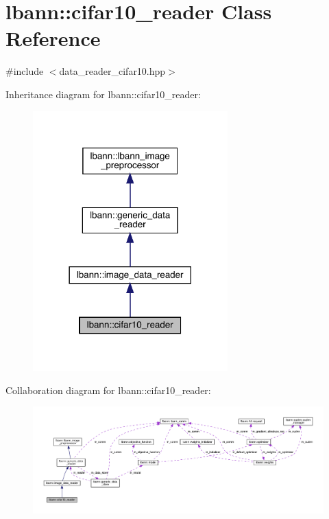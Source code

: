 \hypertarget{classlbann_1_1cifar10__reader}{}\section{lbann\+:\+:cifar10\+\_\+reader Class Reference}
\label{classlbann_1_1cifar10__reader}


{\ttfamily \#include $<$data\+\_\+reader\+\_\+cifar10.\+hpp$>$}



Inheritance diagram for lbann\+:\+:cifar10\+\_\+reader\+:\nopagebreak
\begin{figure}[H]
\begin{center}
\leavevmode
\includegraphics[width=213pt]{classlbann_1_1cifar10__reader__inherit__graph}
\end{center}
\end{figure}


Collaboration diagram for lbann\+:\+:cifar10\+\_\+reader\+:\nopagebreak
\begin{figure}[H]
\begin{center}
\leavevmode
\includegraphics[width=350pt]{classlbann_1_1cifar10__reader__coll__graph}
\end{center}
\end{figure}
